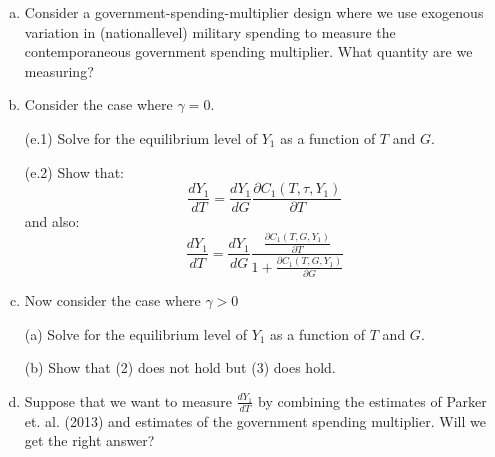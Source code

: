 \documentclass[11pt]{extarticle}
\theoremstyle{plain}
\theoremstyle{definition}
\begin{document}
\begin{enumerate}[(a)]
\item Consider a government-spending-multiplier design where we use exogenous variation in (nationallevel) military spending to measure the contemporaneous government spending multiplier. What quantity are we measuring?


\item  Consider the case where $\gamma=0$.

(e.1) Solve for the equilibrium level of $Y_1$ as a function of $T$ and $G$.

(e.2) Show that:
$$
\frac{d Y_1}{d T}=\frac{d Y_1}{d G} \frac{\partial C_1\left(T, \tau, Y_1\right)}{\partial T}
$$
and also:
$$
\frac{d Y_1}{d T}=\frac{d Y_1}{d G} \frac{\frac{\partial C_1\left(T, G, Y_1\right)}{\partial T}}{1+\frac{\partial C_1\left(T, G, Y_1\right)}{\partial G}}
$$

\item Now consider the case where $\gamma>0$

(a) Solve for the equilibrium level of $Y_1$ as a function of $T$ and $G$.



(b) Show that (2) does not hold but (3) does hold.

\item Suppose that we want to measure $\frac{d Y_1}{d T}$ by combining the estimates of Parker et. al. (2013) and estimates of the government spending multiplier. Will we get the right answer?


\end{enumerate}
\end{document}

